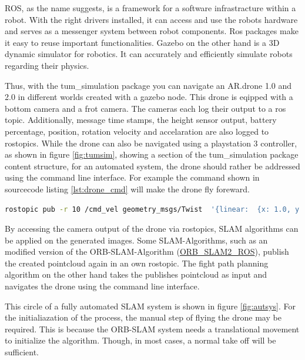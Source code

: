 	
	ROS, as the name suggests, is a framework for a software infrastracture within a robot. With the right drivers installed, 
	it can access and use the robots hardware and serves as a messenger system between robot components. Ros packages make it easy to 
	reuse important functionalities. Gazebo on the other hand is a 3D dynamic simulator for robotics. It can accurately and efficiently simulate robots regarding
	their physics. 
	
	
	Thus, with the tum\_simulation package you can navigate an AR.drone 1.0 and 2.0 in different worlds created with a gazebo node. This drone is eqipped with a bottom camera 
	and a frot camera. The cameras each log their output to a ros topic. Additionally, message time stamps, the height sensor output, 
	battery percentage, position, rotation
	velocity and accelaration are also logged to rostopics. While the drone can also be navigated using a playstation 3 controller, as shown in figure 
	\ref{fig:tumsim}, showing a section of the tum\_simulation package content structure, 
	for an automated system, the drone should rather be addressed using the command line interface. For example 
	the command shown in sourcecode listing \ref{lst:drone_cmd} will make the drone fly foreward. 
	
	\begin{lstlisting}[language=bash, caption=drone navigation command, label=lst:drone_cmd]
    rostopic pub -r 10 /cmd_vel geometry_msgs/Twist  '{linear:  {x: 1.0, y: 0.0, z: 0.0}, angular: {x: 0.0,y: 0.0,z: 0.0}}'
	\end{lstlisting}
	
	
	By accessing the camera output of the drone via rostopics, SLAM algorithms can be applied on the generated images. Some SLAM-Algorithms, 
	such as an modified version of the ORB-SLAM-Algorithm (\href{https://github.com/rayvburn/ORB-SLAM2_ROS}{ORB\_SLAM2\_ROS}), publish the created pointcloud again in an own rostopic.
	The fight path planning algorithm on the other hand takes the publishes pointcloud as input and navigates the drone using the command line interface. 
	
	This circle of a fully automated SLAM system is shown in figure \ref{fig:autsys}. For the initialiazation of the process, the manual step of flying
	the drone may be required. This is because the ORB-SLAM system needs a translational movement to initialize the algorithm. Though, in most cases, 
	a normal take off will be sufficient. 
	

